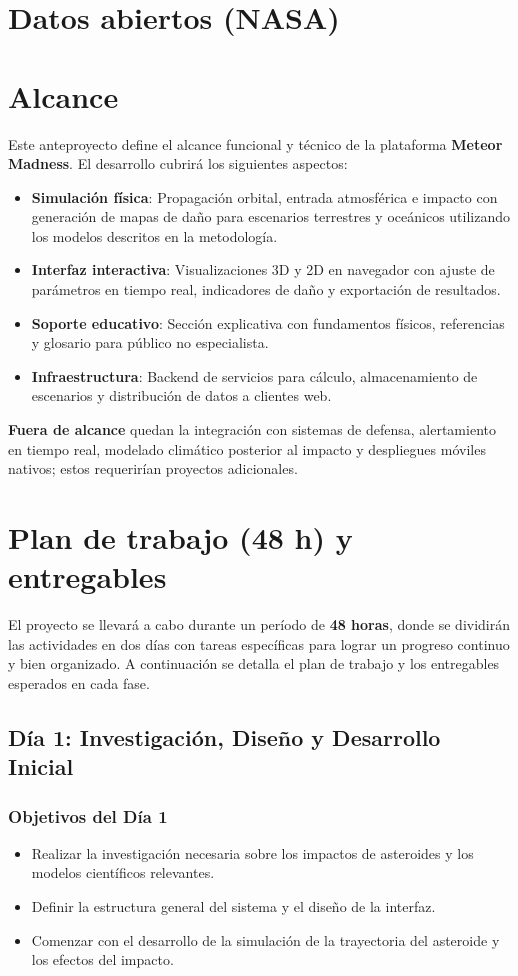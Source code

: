 \documentclass[conference]{IEEEtran}
\begin{document}
\section{Datos abiertos (NASA)}


\section{Alcance}
Este anteproyecto define el alcance funcional y técnico de la plataforma
\textbf{Meteor Madness}. El desarrollo cubrirá los siguientes aspectos:
\begin{itemize}
	\item \textbf{Simulación física}: Propagación orbital, entrada atmosférica e
	      impacto con generación de mapas de daño para escenarios terrestres y
	      oceánicos utilizando los modelos descritos en la metodología.
	\item \textbf{Interfaz interactiva}: Visualizaciones 3D y 2D en navegador con
	      ajuste de parámetros en tiempo real, indicadores de daño y exportación de
	      resultados.
	\item \textbf{Soporte educativo}: Sección explicativa con fundamentos físicos,
	      referencias y glosario para público no especialista.
	\item \textbf{Infraestructura}: Backend de servicios para cálculo, almacenamiento
	      de escenarios y distribución de datos a clientes web.
\end{itemize}
\textbf{Fuera de alcance} quedan la integración con sistemas de defensa,
alertamiento en tiempo real, modelado climático posterior al impacto y
despliegues móviles nativos; estos requerirían proyectos adicionales.

\section{Plan de trabajo (48 h) y entregables}
El proyecto se llevará a cabo durante un período de \textbf{48 horas}, donde se
dividirán las actividades en dos días con tareas específicas para lograr un
progreso continuo y bien organizado. A continuación se detalla el plan de
trabajo y los entregables esperados en cada fase.
\subsection{Día 1: Investigación, Diseño y Desarrollo Inicial}
\subsubsection*{Objetivos del Día 1}
\begin{itemize}
	\item Realizar la investigación necesaria sobre los impactos de asteroides y
	      los modelos científicos relevantes.
	\item Definir la estructura general del sistema y el diseño de la interfaz.
	\item Comenzar con el desarrollo de la simulación de la trayectoria del
	      asteroide y los efectos del impacto.
\end{itemize}
\end{document}
